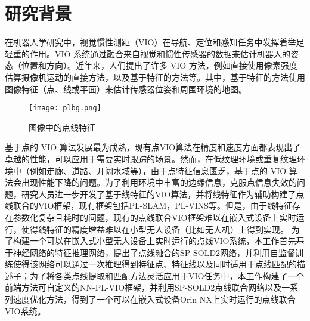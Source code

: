 
\chapter{研究背景}
\label{background}
在机器人学研究中，视觉惯性测距（VIO）在导航、定位和感知任务中发挥着举足轻重的作用。VIO 系统通过融合来自视觉和惯性传感器的数据来估计机器人的姿态（位置和方向）。近年来，人们提出了许多 VIO 方法，例如直接使用像素强度估算摄像机运动的直接方法，以及基于特征的方法等。其中，基于特征的方法使用图像特征（点、线或平面）来估计传感器位姿和周围环境的地图。
\begin{figure}
  \centering
  \texttt{[image: plbg.png]}
  \caption{图像中的点线特征}
  \label{fig_plbg}
\end{figure}
基于点的 VIO 算法发展最为成熟，现有点VIO算法在精度和速度方面都表现出了卓越的性能，可以应用于需要实时跟踪的场景。然而，在低纹理环境或重复纹理环境中（例如走廊、道路、开阔水域等），由于点特征信息匮乏，基于点的 VIO 算法会出现性能下降的问题。为了利用环境中丰富的边缘信息，克服点信息失效的问题，研究人员进一步开发了基于线特征的VIO算法，并将线特征作为辅助构建了点线联合的VIO框架，现有框架包括PL-SLAM\cite{pumarola2017pl}，PL-VINS\cite{fu2020pl}等。但是，由于线特征存在参数化复杂且耗时的问题，现有的点线联合VIO框架难以在嵌入式设备上实时运行，使得线特征的精度增益难以在小型无人设备（比如无人机）上得到实现。 为了构建一个可以在嵌入式小型无人设备上实时运行的点线VIO系统，本工作首先基于神经网络的特征推理网络，提出了点线融合的SP-SOLD2网络，并利用自监督训练使得该网络可以通过一次推理得到特征点、特征线以及同时适用于点线匹配的描述子；为了将各类点线提取和匹配方法灵活应用于VIO任务中，本工作构建了一个前端方法可自定义的NN-PL-VIO框架，并利用SP-SOLD2点线联合网络以及一系列速度优化方法，得到了一个可以在嵌入式设备Orin NX上实时运行的点线联合VIO系统。

